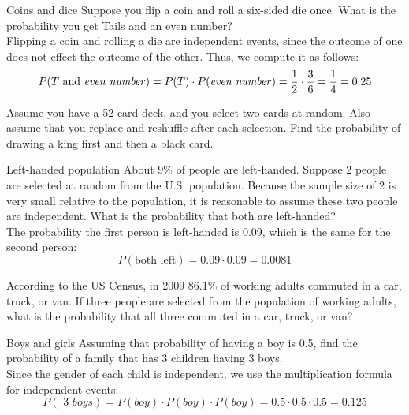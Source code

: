 \begin{example}[https://www.youtube.com/watch?v=twQYgbDkgro]{Coins and dice}
Suppose you flip a coin and roll a six-sided die once. What is the probability you get Tails and an even number?  \\

 Flipping a coin and rolling a die are independent events, since the outcome of one does not effect the outcome of the other. Thus, we compute it as follows:
\[ P(T \mbox{ and } \mbox{\emph{even number}} )= P(T) \cdot P(\mbox{\emph{even number}}) = \frac{1}{2} \cdot \frac{3}{6} = \frac{1}{4} = 0.25  \]
\end{example}

\begin{try}
Assume you have a 52 card deck, and you select two cards at random. Also
assume that you replace and reshuffle after each selection. Find the probability of drawing a king first and then a black card.
\end{try}

\begin{example}[https://www.youtube.com/watch?v=GL_EhwQq-98]{Left-handed population}
About 9\% of people are left-handed. Suppose 2 people are selected at random from the U.S. population. Because the sample size of 2 is
very small relative to the population, it is reasonable to assume these two people are independent. What is the probability that both are left-handed? \\

 The probability the first person is left-handed is 0.09, which is the same for the second person: \[P(\textrm{both left}) = 0.09 \cdot 0.09  = 0.0081 \]
\end{example}

\begin{try}
According to the US Census, in 2009 86.1\% of working adults commuted in a car, truck, or van. If three people are selected from the population of working adults, what is the probability that all three commuted in a car, truck, or van?
\end{try}

\begin{example}[https://www.youtube.com/watch?v=670VxNZAcP8]{Boys and girls}
Assuming that probability of having a boy is 0.5, find the probability of a family that has 3 children having 3 boys. \\

 Since the gender of each child is independent, we use the multiplication formula for independent events:
\[  P( \mbox{ 3 } boys ) = P(boy) \cdot P(boy) \cdot P(boy) = 0.5 \cdot 0.5 \cdot 0.5 = 0.125\]
\end{example}

